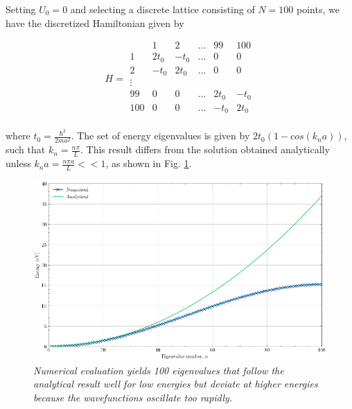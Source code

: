 Setting $U_{0} = 0$ and selecting a discrete lattice consisting of $N = 100$ points, we have the discretized Hamiltonian given by 

\begin{equation}
H =
\begin{matrix}
     & 1 & 2 & \ldots & 99 & 100 \\
    1 & 2t_0 & -t_0 & \ldots & 0 & 0 \\
    2 & -t_0 & 2t_0 & \ldots & 0 & 0 \\
    \vdots  &  &  &  &  &  \\
    99 & 0 & 0 & \ldots & 2t_0 & -t_0 \\
    100 & 0 & 0 & \ldots & -t_0 & 2t_0 \\
\end{matrix}   
\end{equation}

where $t_0 = \frac{\hbar^2}{2ma^{2}}$. The set of energy eigenvalues is given by $2t_{0}(1-cos(k_{n}a))$, such that $k_{n}=\frac{n\pi}{L}$. This result differs from the solution obtained analytically unless $k_{n}a = \frac{n\pi a}{L} << 1$, as shown in Fig. \ref{discrete_PIB}.

\vspace{1cm}

\begin{figure}[h]
\centering
\includegraphics[scale=0.6]{discrete_PIB.png}
\caption{\textit{Numerical evaluation yields 100 eigenvalues that follow the analytical result well for low energies but deviate at higher energies because the wavefunctions oscillate too rapidly.}}\label{discrete_PIB}
\end{figure}

\vspace{1cm}

